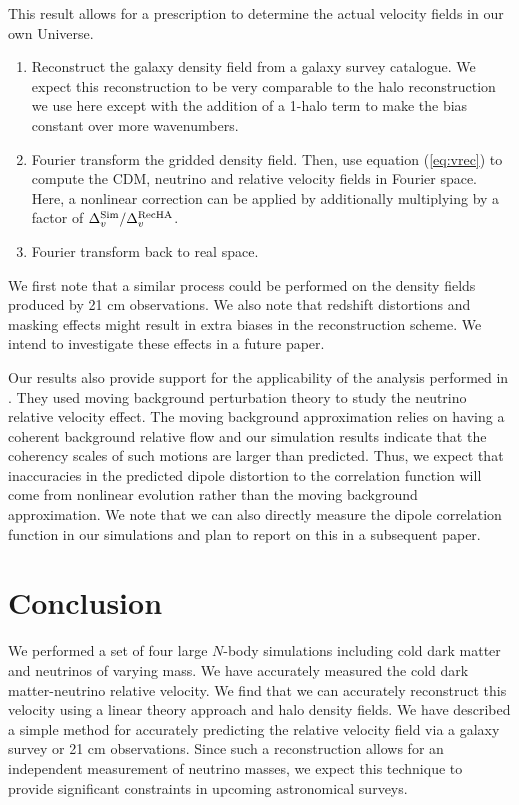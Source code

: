 This result allows for a prescription to determine the actual velocity fields in our own Universe.
\begin{enumerate}
\item Reconstruct the galaxy density field from a galaxy survey catalogue. We expect this reconstruction to be very comparable to the halo reconstruction we use here except with the addition of a 1-halo term to make the bias constant over more wavenumbers.
\item Fourier transform the gridded density field.  Then, use equation (\ref{eq:vrec}) to compute the CDM, neutrino and relative velocity fields in Fourier space.  Here, a nonlinear correction can be applied by additionally multiplying by a factor of $\Delta_v^{\rm Sim}/\Delta_v^{\rm Rec HA}$.
\item Fourier transform back to real space.
\end{enumerate}
We first note that a similar process could be performed on the density fields produced by 21 cm observations.  We also note that redshift distortions and masking effects might result in extra biases in the reconstruction scheme.  We intend to investigate these effects in a future paper. 
  
Our results also provide support for the applicability of the analysis performed in \citet{zhu/etal:2014b,zhu/etal:2014a}.  They used moving background perturbation theory to study the neutrino relative velocity effect.  The moving background approximation relies on having a coherent background relative flow and our simulation results indicate that the coherency scales of such motions are larger than predicted.  Thus, we expect that inaccuracies in the predicted dipole distortion to the correlation function will come from nonlinear evolution rather than the moving background approximation.  We note that we can also directly measure the dipole correlation function in our simulations and plan to report on this in a subsequent paper.  
  
  
\section{Conclusion}
\label{sec:conclusion}
  
We performed a set of four large $N$-body simulations including cold dark matter and neutrinos of varying mass.  We have accurately measured the cold dark matter-neutrino relative velocity.  We find that we can accurately reconstruct this velocity using a linear theory approach and halo density fields.  We have described a simple method for accurately predicting the relative velocity field via a galaxy survey or 21 cm observations.  Since such a reconstruction allows for an independent measurement of neutrino masses, we expect this technique to provide significant constraints in upcoming astronomical surveys.  

